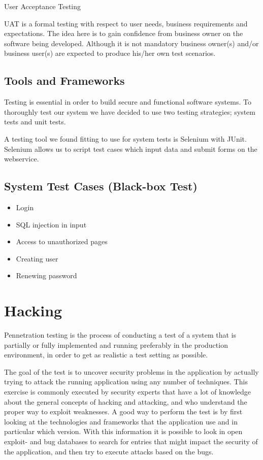 \documentclass[a4paper]{article}
\begin{document}
User Acceptance Testing 

UAT is a formal testing with respect to user needs, business requirements and expectations.  The idea here is to gain confidence from business owner on the software being developed.  Although it is not mandatory business owner(s) and/or business user(s) are expected to produce his/her own test scenarios.
\subsection{Tools and Frameworks}
Testing is essential in order to build secure and functional software systems. To thoroughly test our system we have decided to use two testing strategies; system tests and unit tests.

A testing tool we found fitting to use for system tests is Selenium with JUnit. Selenium allows us to script test cases which input data and submit forms on the webservice.

\subsection{System Test Cases (Black-box Test)}

\begin{itemize}
\item Login
\item SQL injection in input
\item Access to unauthorized pages
\item Creating user
\item Renewing password
\end{itemize}

\section{Hacking}
Pennetration testing is the process of conducting a test of a system that is partially or fully implemented and running preferably in the production environment, in order to get as realistic a test setting as possible.

The goal of the test is to uncover security problems in the application by actually trying to attack the running application using any number of techniques. This exercise is commonly executed by security experts that have a lot of knowledge about the general concepts of hacking and attacking, and who understand the proper way to exploit weaknesses. 
A good way to perform the test is by first looking at the technologies and frameworks that the application use and in particular which version. With this information it is possible to look in open exploit- and bug databases to search for entries that might impact the security of the application, and then try to execute attacks based on the bugs.
\end{document}
